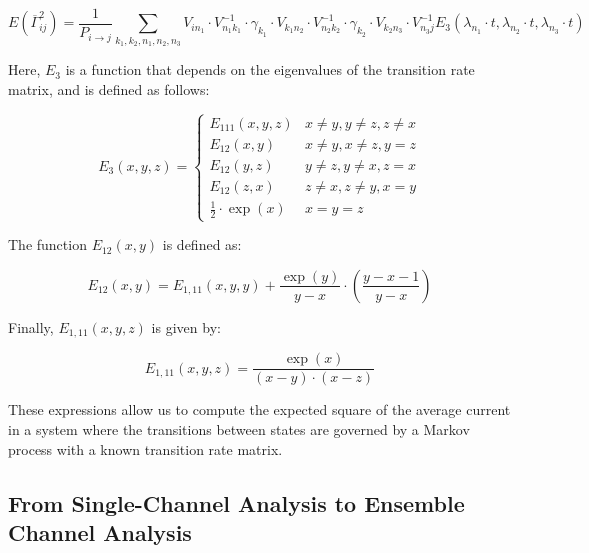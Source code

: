 \documentclass[pdflatex,sn-mathphys-num]{sn-jnl}%
\theoremstyle{thmstyleone}%
\theoremstyle{thmstyletwo}%
\theoremstyle{thmstylethree}%
\begin{document}
\begin{equation}
	E(\overline{\Gamma}_{ij}^2) = \frac{1}{P_{i \rightarrow j}} \sum_{k_1, k_2, n_1, n_2, n_3} V_{i n_1} \cdot V^{-1}_{n_1 k_1} \cdot \gamma_{k_1} \cdot V_{k_1 n_2} \cdot V^{-1}_{n_2 k_2} \cdot \gamma_{k_2} \cdot V_{k_2 n_3} \cdot V^{-1}_{n_3 j} E_3(\lambda_{n_1} \cdot t, \lambda_{n_2} \cdot t, \lambda_{n_3} \cdot t)
\end{equation}

Here, \(E_3\) is a function that depends on the eigenvalues of the transition rate matrix, and is defined as follows:

\begin{equation}
	E_3(x,y,z)= 
	\begin{cases}
		E_{111}(x,y,z) & x\neq y, y\neq z, z\neq x \\
		E_{12}(x,y) & x\neq y, x\neq z, y = z \\
		E_{12}(y,z) & y\neq z, y\neq x, z = x \\
		E_{12}(z,x) & z\neq x, z\neq y, x = y \\
		\frac{1}{2} \cdot \exp(x) & x=y=z
	\end{cases}
\end{equation}

The function \(E_{12}(x, y)\) is defined as:

\begin{equation}
	E_{12}(x,y) = E_{1,11}(x, y, y) + \frac{\exp(y)}{y - x} \cdot \left(\frac{y - x - 1}{y - x}\right)
\end{equation}

Finally, \(E_{1,11}(x, y, z)\) is given by:

\begin{equation}
	E_{1,11}(x, y, z) = \frac{\exp(x)}{(x - y) \cdot (x - z)}
\end{equation}

These expressions allow us to compute the expected square of the average current in a system where the transitions between states are governed by a Markov process with a known transition rate matrix.








\subsection{From Single-Channel Analysis to Ensemble Channel Analysis}
\end{document}
